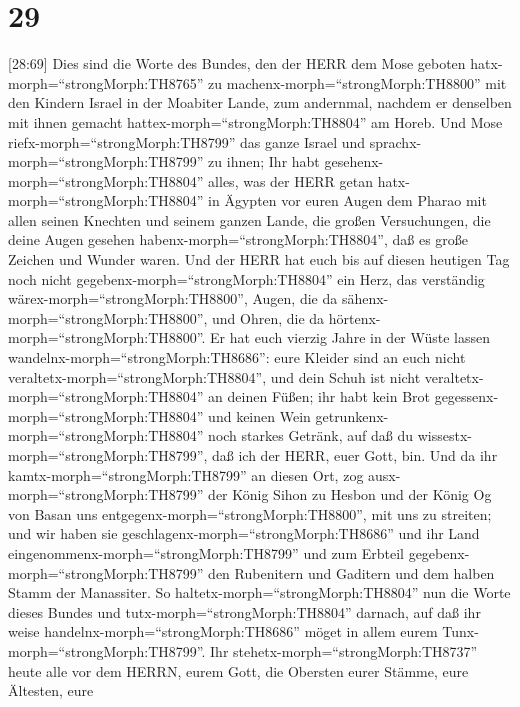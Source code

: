 \hypertarget{section-28}{%
\section{29}\label{section-28}}

 {[}28:69{]} Dies sind die Worte des Bundes, den der HERR
dem Mose geboten hatx-morph=``strongMorph:TH8765'' zu
machenx-morph=``strongMorph:TH8800'' mit den Kindern Israel in der
Moabiter Lande, zum andernmal, nachdem er denselben mit ihnen gemacht
hattex-morph=``strongMorph:TH8804'' am Horeb.  Und Mose
riefx-morph=``strongMorph:TH8799'' das ganze Israel und
sprachx-morph=``strongMorph:TH8799'' zu ihnen; Ihr habt
gesehenx-morph=``strongMorph:TH8804'' alles, was der HERR getan
hatx-morph=``strongMorph:TH8804'' in Ägypten vor euren Augen dem Pharao
mit allen seinen Knechten und seinem ganzen Lande,  die
großen Versuchungen, die deine Augen gesehen
habenx-morph=``strongMorph:TH8804'', daß es große Zeichen und Wunder
waren.  Und der HERR hat euch bis auf diesen heutigen Tag
noch nicht gegebenx-morph=``strongMorph:TH8804'' ein Herz, das
verständig wärex-morph=``strongMorph:TH8800'', Augen, die da
sähenx-morph=``strongMorph:TH8800'', und Ohren, die da
hörtenx-morph=``strongMorph:TH8800''.  Er hat euch vierzig
Jahre in der Wüste lassen wandelnx-morph=``strongMorph:TH8686'': eure
Kleider sind an euch nicht veraltetx-morph=``strongMorph:TH8804'', und
dein Schuh ist nicht veraltetx-morph=``strongMorph:TH8804'' an deinen
Füßen;  ihr habt kein Brot
gegessenx-morph=``strongMorph:TH8804'' und keinen Wein
getrunkenx-morph=``strongMorph:TH8804'' noch starkes Getränk, auf daß du
wissestx-morph=``strongMorph:TH8799'', daß ich der HERR, euer Gott, bin.
 Und da ihr kamtx-morph=``strongMorph:TH8799'' an diesen
Ort, zog ausx-morph=``strongMorph:TH8799'' der König Sihon zu Hesbon und
der König Og von Basan uns entgegenx-morph=``strongMorph:TH8800'', mit
uns zu streiten; und wir haben sie
geschlagenx-morph=``strongMorph:TH8686''  und ihr Land
eingenommenx-morph=``strongMorph:TH8799'' und zum Erbteil
gegebenx-morph=``strongMorph:TH8799'' den Rubenitern und Gaditern und
dem halben Stamm der Manassiter.  So
haltetx-morph=``strongMorph:TH8804'' nun die Worte dieses Bundes und
tutx-morph=``strongMorph:TH8804'' darnach, auf daß ihr weise
handelnx-morph=``strongMorph:TH8686'' möget in allem eurem
Tunx-morph=``strongMorph:TH8799''.  Ihr
stehetx-morph=``strongMorph:TH8737'' heute alle vor dem HERRN, eurem
Gott, die Obersten eurer Stämme, eure Ältesten, eure
